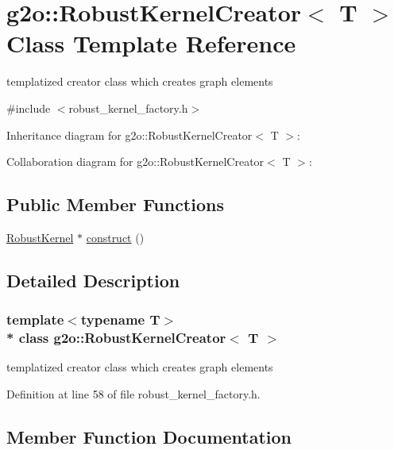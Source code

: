 \hypertarget{classg2o_1_1RobustKernelCreator}{}\section{g2o\+:\+:Robust\+Kernel\+Creator$<$ T $>$ Class Template Reference}
\label{classg2o_1_1RobustKernelCreator}


templatized creator class which creates graph elements  




{\ttfamily \#include $<$robust\+\_\+kernel\+\_\+factory.\+h$>$}



Inheritance diagram for g2o\+:\+:Robust\+Kernel\+Creator$<$ T $>$\+:


Collaboration diagram for g2o\+:\+:Robust\+Kernel\+Creator$<$ T $>$\+:
\subsection*{Public Member Functions}
\begin{DoxyCompactItemize}
\item 
\hyperlink{classg2o_1_1RobustKernel}{Robust\+Kernel} $\ast$ \hyperlink{classg2o_1_1RobustKernelCreator_a6ab30adc017675641bd55502d7da0085}{construct} ()
\end{DoxyCompactItemize}


\subsection{Detailed Description}
\subsubsection*{template$<$typename T$>$\\*
class g2o\+::\+Robust\+Kernel\+Creator$<$ T $>$}

templatized creator class which creates graph elements 

Definition at line 58 of file robust\+\_\+kernel\+\_\+factory.\+h.



\subsection{Member Function Documentation}
